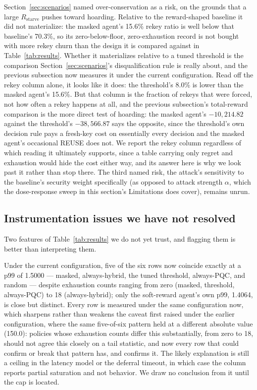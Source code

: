 \documentclass[conference]{IEEEtran}
\begin{document}
Section~\ref{sec:scenarios} named over-conservation as a risk, on the
grounds that a large $R_{\text{starve}}$ pushes toward hoarding. Relative
to the reward-shaped baseline it did not materialize: the
masked agent's 15.6\% rekey ratio is well below that baseline's
70.3\%, so its zero-below-floor, zero-exhaustion record is not
bought with more rekey churn than the design it is compared
against in Table~\ref{tab:results}. Whether it materializes relative to a
tuned threshold is the comparison Section~\ref{sec:scenarios}'s
disqualification rule is really about, and the previous subsection
now measures it under the current configuration. Read off the rekey
column alone, it looks like it does: the threshold's 8.0\% is lower
than the masked agent's 15.6\%. But that column is the fraction of
rekeys that were forced, not how often a rekey happens at all, and
the previous subsection's total-reward comparison is the more direct
test of hoarding: the masked agent's $-10{,}214.82$ against the
threshold's $-38{,}566.87$ says the opposite, since the threshold's
own decision rule pays a fresh-key cost on essentially every
decision and the masked agent's occasional REUSE does not. We report
the rekey column regardless of which reading it ultimately supports,
since a table carrying only regret and exhaustion would hide
the cost either way, and its answer here is why we look past it
rather than stop there. The third named risk, the attack's
sensitivity to the baseline's security weight specifically (as
opposed to attack strength $\alpha$, which the dose-response sweep
in this section's Limitations does cover), remains unrun.

\subsection{Instrumentation issues we have not resolved}
\label{sec:instrumentation}

Two features of Table~\ref{tab:results} we do not yet trust, and flagging
them is better than interpreting them.

Under the current configuration, five of the six rows now coincide
exactly at a p99 of 1.5000 --- masked, always-hybrid, the tuned
threshold, always-PQC, and random --- despite exhaustion counts
ranging from zero (masked, threshold, always-PQC) to 18
(always-hybrid); only the soft-reward agent's own p99, 1.4064, is
close but distinct. Every row is measured under the same
configuration now, which sharpens rather than weakens the caveat
first raised under the earlier configuration, where the same
five-of-six pattern held at a different absolute value (150.0):
policies whose exhaustion counts differ this substantially, from
zero to 18, should not agree this closely on a tail statistic, and
now every row that could confirm or break that pattern has, and
confirms it. The likely explanation is still a ceiling in the
latency model or the deferral timeout, in which case the column
reports partial saturation and not behavior. We draw no conclusion
from it until the cap is located.
\end{document}
